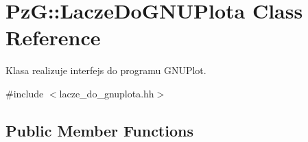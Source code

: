 \hypertarget{class_pz_g_1_1_lacze_do_g_n_u_plota}{\section{Pz\+G\+:\+:Lacze\+Do\+G\+N\+U\+Plota Class Reference}
\label{class_pz_g_1_1_lacze_do_g_n_u_plota}
}


Klasa realizuje interfejs do programu G\+N\+U\+Plot.  




{\ttfamily \#include $<$lacze\+\_\+do\+\_\+gnuplota.\+hh$>$}

\subsection*{Public Member Functions}
